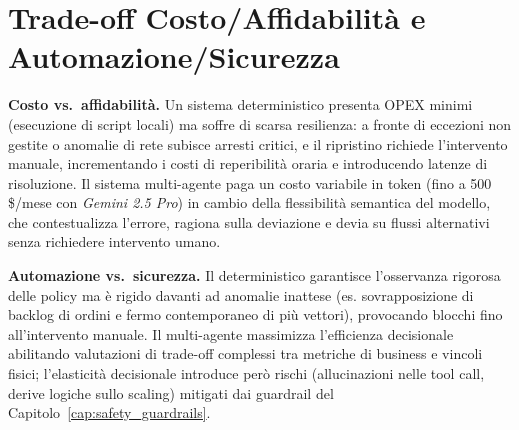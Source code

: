 \section{Trade-off Costo/Affidabilità e Automazione/Sicurezza}
\label{sec:analisi_tradeoff}

\textbf{Costo vs.\ affidabilità.} Un sistema deterministico presenta OPEX minimi (esecuzione di script locali) ma soffre di scarsa resilienza: a fronte di eccezioni non gestite o anomalie di rete subisce arresti critici, e il ripristino richiede l'intervento manuale, incrementando i costi di reperibilità oraria e introducendo latenze di risoluzione. Il sistema multi-agente paga un costo variabile in token (fino a 500\,\$/mese con \textit{Gemini 2.5 Pro}) in cambio della flessibilità semantica del modello, che contestualizza l'errore, ragiona sulla deviazione e devia su flussi alternativi senza richiedere intervento umano.

\textbf{Automazione vs.\ sicurezza.} Il deterministico garantisce l'osservanza rigorosa delle policy ma è rigido davanti ad anomalie inattese (es. sovrapposizione di backlog di ordini e fermo contemporaneo di più vettori), provocando blocchi fino all'intervento manuale. Il multi-agente massimizza l'efficienza decisionale abilitando valutazioni di trade-off complessi tra metriche di business e vincoli fisici; l'elasticità decisionale introduce però rischi (allucinazioni nelle tool call, derive logiche sullo scaling) mitigati dai guardrail del Capitolo~\ref{cap:safety_guardrails}.
